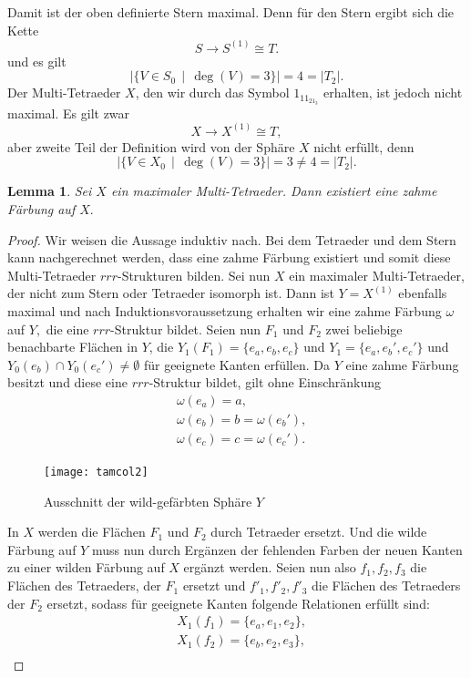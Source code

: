 \documentclass[12pt,titlepage,twoside,cleardoublepage]{article}
\theoremstyle{nummermitklammern}
\newtheorem{lemma}[temp]{Lemma}
\newtheorem{lemma}[zahl]{Lemma}
\numberwithin{equation}{section}
\begin{document}
Damit ist der oben definierte Stern maximal. 
Denn für den Stern ergibt sich die Kette 
\[
S\to S^{(1)}\cong T.
\]
und es gilt 
\[
\vert \{V\in S_0\,\mid \, \deg(V)=3\}\vert=4=\vert T_2\vert .
\]
Der Multi-Tetraeder $X$, den wir durch das Symbol $1_11_21_3$ erhalten, ist jedoch nicht maximal. Es gilt zwar
\[
X\to X^{(1)}\cong T,
\] 
aber zweite Teil der Definition wird von der Sphäre $X$ nicht erfüllt, denn 
\[
\vert \{V\in X_0\,\mid \, \deg(V)=3\}\vert=3\neq 4=\vert T_2\vert.
\]
\begin{lemma}\label{max}
Sei $X$ ein maximaler Multi-Tetraeder. Dann existiert eine zahme Färbung auf $X.$
\end{lemma}
\begin{proof}
Wir weisen die Aussage induktiv nach. Bei dem Tetraeder und dem Stern kann nachgerechnet werden, dass eine zahme Färbung existiert und somit diese Multi-Tetraeder $rrr$-Strukturen bilden. Sei nun $X$ ein maximaler Multi-Tetraeder, der nicht zum Stern oder Tetraeder isomorph ist.
 Dann ist $Y=X^{(1)}$ ebenfalls maximal und nach Induktionsvoraussetzung erhalten wir eine zahme Färbung $\omega$ auf $Y,$ die eine $rrr$-Struktur bildet. Seien nun $F_1$ und $F_2$ zwei beliebige benachbarte Flächen in $Y$, die $Y_1(F_1)=\{e_a,e_b,e_c\}$ und $Y_1=\{e_a,e_b',e_c'\}$ und $Y_0(e_b)\cap Y_0(e_c')\neq \emptyset$ für geeignete Kanten erfüllen.
Da $Y$ eine zahme Färbung besitzt und diese eine $rrr$-Struktur bildet, gilt ohne Einschränkung
\begin{align*}
&\omega(e_a)=a,\\
&\omega(e_b)=b=\omega(e_b'),\\
&\omega(e_c)=c=\omega(e_c').
\end{align*}
\begin{figure}[H]
\begin{center}
\texttt{[image: tamcol2]}
\end{center}
\caption{Ausschnitt der wild-gefärbten Sphäre $Y$}
\end{figure}
In $X$ werden die Flächen $F_1$ und $F_2$ durch Tetraeder ersetzt. Und die wilde Färbung auf $Y$ muss nun durch Ergänzen der fehlenden Farben der neuen Kanten zu einer wilden Färbung auf $X$ ergänzt werden. Seien nun also $f_1,f_2,f_3$ die Flächen des Tetraeders, der $F_1$ ersetzt und $f'_1,f'_2,f'_3$ die Flächen des Tetraeders der $F_2$ ersetzt, sodass für geeignete Kanten folgende Relationen erfüllt sind:
\begin{align*}
&X_1(f_1)=\{e_a,e_1,e_2\},\\
&X_1(f_2)=\{e_b,e_2,e_3\},\\

\end{align*}
\end{proof}
\end{document}

